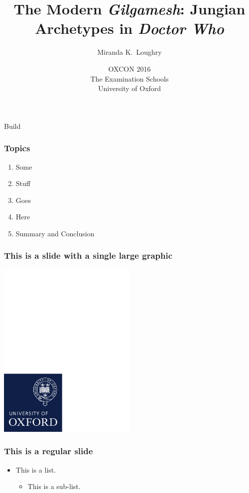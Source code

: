 \documentclass{beamer}
\title{The Modern \emph{Gilgamesh}: Jungian Archetypes in \emph{Doctor Who}}
\author{Miranda K.\ Loughry}
\institute{St Mary's Academy \\
    Englewood, Colorado 80113 USA \\
    \url{miranda.loughry@gmail.com}
}
\date{OXCON 2016 \\ The Examination Schools \\ University of Oxford}
\begin{document}
\begin{frame}
	\titlepage
    \vfill
    {\tiny Build }
\end{frame}

\begin{frame}
	\frametitle{Topics}
	\begin{enumerate}
		\item Some
		\item Stuff
		\item Goes
		\item Here
		\item Summary and Conclusion
	\end{enumerate}
\end{frame}

\begin{frame}
	\frametitle{This is a slide with a single large graphic}
	\includegraphics[width=0.5\textwidth,trim=0 0 117mm 183mm,clip]{graphics/ox_brand_cmyk_pos.pdf}
	\begin{center}
	\end{center}
\end{frame}

\begin{frame}
	\frametitle{This is a regular slide}
	\begin{itemize}
		\item This is a list.
			\begin{itemize}
				\item This is a sub-list.
			\end{itemize}
	\end{itemize}
\end{frame}
\end{document}
